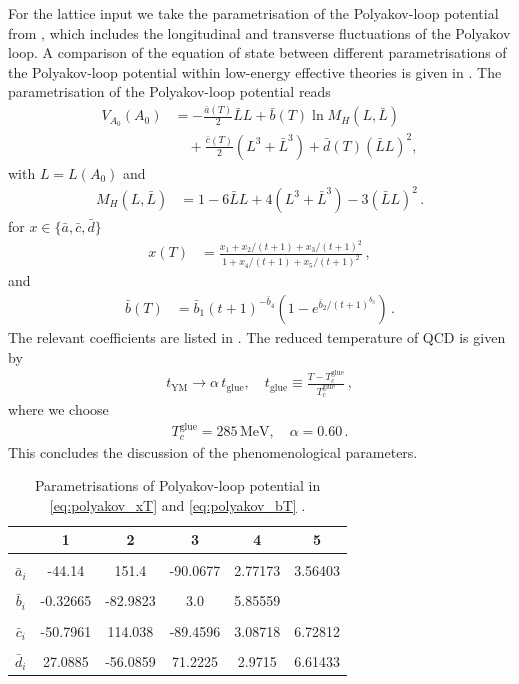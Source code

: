 \documentclass[reprint,twocolumn,superscriptaddress,preprintnumbers,amsmath,amssymb,aps,prd,floatfix]{revtex4-2}
\begin{document}
For the lattice input we take the parametrisation of the Polyakov-loop potential from \cite{Lo:2013hla}, which includes the longitudinal and transverse fluctuations of the Polyakov loop. A comparison of the equation of state between different parametrisations of the Polyakov-loop potential within low-energy effective theories is given in \cite{Wen:2018nkn}. The parametrisation of the Polyakov-loop potential reads
%
\begin{align}
   \nonumber V_{A_0}(A_0) &= -\frac{\bar a(T)}{2} \bar L L + \bar b(T)\ln M_H(L,\bar{L})\\ 
  &\quad+ \frac{\bar c(T)}{2} (L^3+\bar L^3) + \bar d(T) (\bar{L} L)^2,
%
\end{align}
%
with $L=L(A_0)$ and 
%
\begin{align}
M_H (L, \bar{L})&= 1 -6 \bar{L}L + 4 (L^3+\bar{L}^3) - 3  (\bar{L}L)^2\,.
\end{align}
%
for $x\in \{\bar a, \bar c, \bar d\}$
%
\begin{align}\label{eq:polyakov_xT}
  x(T) &= \frac{x_1 + x_2/(t+1) + x_3/(t+1)^2}{1 + x_4/(t+1) + x_5/(t+1)^2}\,,
\end{align}
%
and
%
\begin{align}\label{eq:polyakov_bT}
  \bar b(T) &=\bar b_1 (t+1)^{-\bar b_4}(1 -e^{\bar b_2/(t+1)^{\bar b_3}} )\,.
\end{align}
%
The relevant coefficients are listed in . The reduced temperature of QCD is given by
%
\begin{align}
  t_{\text{YM}}\rightarrow \alpha\,t_{\text{glue}},\quad
  t_{\text{glue}}\equiv \frac{T-T_c^\text{glue}}{T_c^\text{glue}}\,,
\end{align}
%
where we choose
%
\begin{align}
T_c^{\text{glue}}=285\, \text{MeV},\quad
\alpha=0.60\,.
\end{align}
%
This concludes the discussion of the phenomenological parameters. 


\begin{table}[t]
  \centering
  \begin{tabular}{|c||c|c|c|c|c|}
    \hline
    & 1 & 2 & 3 & 4 & 5 \rule{0pt}{2.6ex}\rule[-1.2ex]{0pt}{0pt}
    \\[1ex] \hline & & & & & \\[-1ex]
    $\bar a_i$ &-44.14& 151.4 & -90.0677 &2.77173 &3.56403 \\[1ex]  & & & & & \\[-2ex]
    $\bar b_i$ &-0.32665 &-82.9823 &3.0 &5.85559  & \\[1ex]  & & & & & \\[-2ex]
    $\bar c_i$ &-50.7961 &114.038 &-89.4596 &3.08718 &6.72812 \\[1ex]  & & & & & \\[-2ex]
    $\bar d_i$ &27.0885 &-56.0859 &71.2225 &2.9715 &6.61433\\[1ex] \hline
  \end{tabular}
  \caption{Parametrisations of Polyakov-loop potential in \cref{eq:polyakov_xT} and \cref{eq:polyakov_bT} .}
  \label{tab:polyakov}
\end{table}
\end{document}
